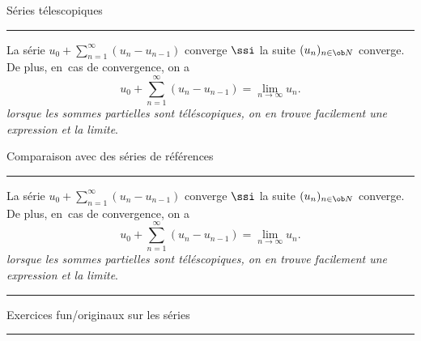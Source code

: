 \centerline{Séries télescopiques}
\hrule
\medskip\noindent

La série $u_0+\sum_{n=1}^\infty(u_n-u_{n-1})$ converge $\ssi$ la suite 
$(u_n)_{n\in\ob N}$ converge. De plus, en~cas de convergence, on a 
$$
u_0+\sum_{n=1}^\infty(u_n-u_{n-1})=\lim_{n\to\infty}u_n. 
$$
{\it lorsque les sommes partielles sont téléscopiques, on en trouve facilement une expression et la limite}. 

\noindent
{}
\vfill
\noindent
{}
\vfill
\noindent
{}
\vfill

\centerline{Comparaison avec des séries de références}
\hrule
\medskip\noindent
{}
La série $u_0+\sum_{n=1}^\infty(u_n-u_{n-1})$ converge $\ssi$ la suite 
$(u_n)_{n\in\ob N}$ converge. De plus, en~cas de convergence, on a 
$$
u_0+\sum_{n=1}^\infty(u_n-u_{n-1})=\lim_{n\to\infty}u_n. 
$$
{\it lorsque les sommes partielles sont téléscopiques, on en trouve facilement une expression et la limite}. 

\medskip\noindent
\bigskip
{}
\bigskip
{}
\bigskip
{}
\bigskip
{}
\bigskip
{}
\bigskip
{}
\bigskip
{}
\bigskip
\hrule
\smallskip
\centerline{Exercices fun/originaux sur les séries}
\smallskip
\hrule
\bigskip
{}
\bigskip
{}
\bigskip
{}


\vfill\null











\bye